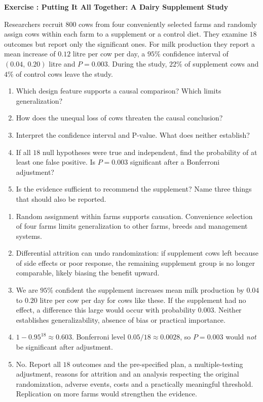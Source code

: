 \documentclass[11pt]{article}
\newcounter{exercise}
\newcommand{\exercise}[1]{%
  \par\medskip
  \refstepcounter{exercise}%
  {\large\bfseries\color{CourseBlue} Exercise \theexercise: #1}\par\smallskip}
\begin{document}
\exercise{Putting It All Together: A Dairy Supplement Study}

Researchers recruit $800$ cows from four conveniently selected farms and randomly assign cows within each farm to a supplement or a control diet. They examine $18$ outcomes but report only the significant ones. For milk production they report a mean increase of $0.12$ litre per cow per day, a $95\%$ confidence interval of $(0.04,\ 0.20)$ litre and $P=0.003$. During the study, $22\%$ of supplement cows and $4\%$ of control cows leave the study.

\begin{enumerate}
  \item Which design feature supports a causal comparison? Which limits generalization?
  \item How does the unequal loss of cows threaten the causal conclusion?
  \item Interpret the confidence interval and P-value. What does neither establish?
  \item If all $18$ null hypotheses were true and independent, find the probability of at least one false positive. Is $P=0.003$ significant after a Bonferroni adjustment?
  \item Is the evidence sufficient to recommend the supplement? Name three things that should also be reported.
\end{enumerate}

\begin{solution}
\begin{enumerate}
  \item Random assignment within farms supports causation. Convenience selection of four farms limits generalization to other farms, breeds and management systems.
  \item Differential attrition can undo randomization: if supplement cows left because of side effects or poor response, the remaining supplement group is no longer comparable, likely biasing the benefit upward.
  \item We are $95\%$ confident the supplement increases mean milk production by $0.04$ to $0.20$ litre per cow per day for cows like these. If the supplement had no effect, a difference this large would occur with probability $0.003$. Neither establishes generalizability, absence of bias or practical importance.
  \item $1-0.95^{18}\approx0.603$. Bonferroni level $0.05/18\approx0.0028$, so $P=0.003$ would \emph{not} be significant after adjustment.
  \item No. Report all $18$ outcomes and the pre-specified plan, a multiple-testing adjustment, reasons for attrition and an analysis respecting the original randomization, adverse events, costs and a practically meaningful threshold. Replication on more farms would strengthen the evidence.
\end{enumerate}
\end{solution}
\end{document}
